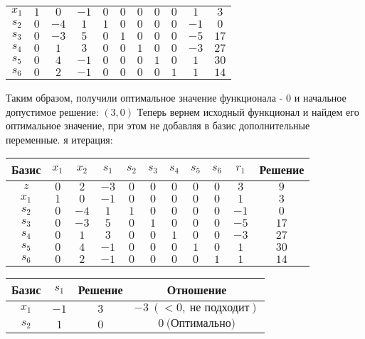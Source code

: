 \documentclass{article}%
\begin{document}
\begin{flushleft}
\begin{tabular}{|c|ccccccccc|c|}
\hline%
$x_{1}$&$1$&$0$&$-1$&$0$&$0$&$0$&$0$&$0$&$1$&$3$\\%
$s_{2}$&$0$&$-4$&$1$&$1$&$0$&$0$&$0$&$0$&$-1$&$0$\\%
$s_{3}$&$0$&$-3$&$5$&$0$&$1$&$0$&$0$&$0$&$-5$&$17$\\%
$s_{4}$&$0$&$1$&$3$&$0$&$0$&$1$&$0$&$0$&$-3$&$27$\\%
$s_{5}$&$0$&$4$&$-1$&$0$&$0$&$0$&$1$&$0$&$1$&$30$\\%
$s_{6}$&$0$&$2$&$-1$&$0$&$0$&$0$&$0$&$1$&$1$&$14$\\%
\hline%
\end{tabular}%
\newline%
\newline%
Таким образом, получили оптимальное значение функционала {-} 0 и начальное допустимое решение: %
$(3, 0)$%
\newline%
Теперь вернем исходный функционал и найдем его оптимальное значение, при этом не добавляя в базис дополнительные переменные.%
я итерация: %
\newline%
\newline%
\renewcommand{\arraystretch}{1.3}%
\begin{tabular}{|c|ccccccccc|c|}%
\hline%
Базис&$x_{1}$&$x_{2}$&$s_{1}$&$s_{2}$&$s_{3}$&$s_{4}$&$s_{5}$&$s_{6}$&$r_{1}$&Решение\\%
\hline%
$z$&$0$&$2$&$-3$&$0$&$0$&$0$&$0$&$0$&$3$&$9$\\%
\hline%
$x_{1}$&$1$&$0$&$-1$&$0$&$0$&$0$&$0$&$0$&$1$&$3$\\%
$s_{2}$&$0$&$-4$&$1$&$1$&$0$&$0$&$0$&$0$&$-1$&$0$\\%
$s_{3}$&$0$&$-3$&$5$&$0$&$1$&$0$&$0$&$0$&$-5$&$17$\\%
$s_{4}$&$0$&$1$&$3$&$0$&$0$&$1$&$0$&$0$&$-3$&$27$\\%
$s_{5}$&$0$&$4$&$-1$&$0$&$0$&$0$&$1$&$0$&$1$&$30$\\%
$s_{6}$&$0$&$2$&$-1$&$0$&$0$&$0$&$0$&$1$&$1$&$14$\\%
\hline%
\end{tabular}%
\newline%
\newline%
\newline%
\begin{tabular}{|cccc|}%
\hline%
Базис&$s_{1}$&Решение&Отношение\\%
\hline%
$x_{1}$&$-1$&$3$&$-3\: (< 0, \: \text{не подходит})$\\%
$s_{2}$&$1$&$0$&$0\: \text{(Оптимально)}$\\%

\end{tabular}
\end{flushleft}
\end{document}
